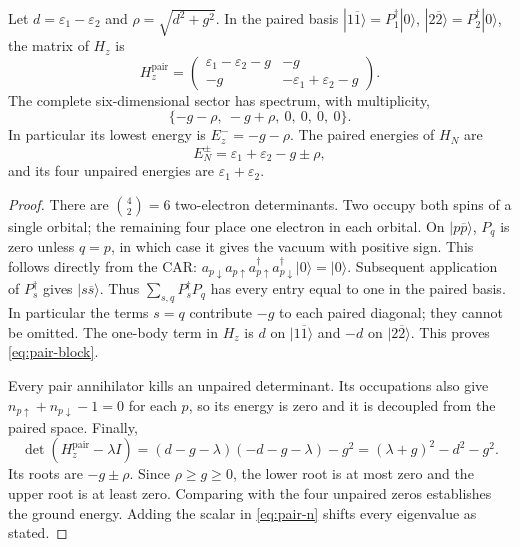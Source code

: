 \begin{proposition}
\label{prop:pairing}
Let $d=\varepsilon_1-\varepsilon_2$ and
$\rho=\sqrt{d^2+g^2}$. In the paired basis
$|1\overline1\rangle=P_1^\dagger|0\rangle$,
$|2\overline2\rangle=P_2^\dagger|0\rangle$, the matrix of $H_z$ is
\begin{equation}
 H_z^{\mathrm{pair}}=
 \begin{pmatrix}
 \varepsilon_1-\varepsilon_2-g&-g\\
 -g&-\varepsilon_1+\varepsilon_2-g
 \end{pmatrix}.
 \label{eq:pair-block}
\end{equation}
The complete six-dimensional sector has spectrum, with multiplicity,
\begin{equation}
 \{-g-\rho,\ -g+\rho,\ 0,\ 0,\ 0,\ 0\}.
 \label{eq:pair-spectrum}
\end{equation}
In particular its lowest energy is $E_z^-=-g-\rho$.
The paired energies of $H_N$ are
\begin{equation}
 E_N^\pm=\varepsilon_1+\varepsilon_2-g\pm\rho,
 \label{eq:number-roots}
\end{equation}
and its four unpaired energies are $\varepsilon_1+\varepsilon_2$.
\end{proposition}
\begin{proof}
There are $\binom42=6$ two-electron determinants. Two occupy both spins
of a single orbital; the remaining four place one electron in each orbital.
On $|p\overline p\rangle$, $P_q$ is zero unless $q=p$, in which case
it gives the vacuum with positive sign. This follows directly from the CAR:
$a_{p\downarrow}a_{p\uparrow}a_{p\uparrow}^\dagger
 a_{p\downarrow}^\dagger|0\rangle=|0\rangle$.
Subsequent application of $P_s^\dagger$ gives
$|s\overline s\rangle$. Thus $\sum_{s,q}P_s^\dagger P_q$ has every
entry equal to one in the paired basis. In particular the terms $s=q$
contribute $-g$ to each paired diagonal; they cannot be omitted.
The one-body term in $H_z$ is $d$ on $|1\overline1\rangle$ and
$-d$ on $|2\overline2\rangle$. This proves \eqref{eq:pair-block}.

Every pair annihilator kills an unpaired determinant. Its occupations also
give $n_{p\uparrow}+n_{p\downarrow}-1=0$ for each $p$, so its energy
is zero and it is decoupled from the paired space. Finally,
\[
 \det(H_z^{\mathrm{pair}}-\lambda I)
 =(d-g-\lambda)(-d-g-\lambda)-g^2
 =(\lambda+g)^2-d^2-g^2.
\]
Its roots are $-g\pm\rho$. Since $\rho\ge g\ge0$, the lower root
is at most zero and the upper root is at least zero. Comparing with the four
unpaired zeros establishes the ground energy. Adding the scalar in
\eqref{eq:pair-n} shifts every eigenvalue as stated.
\end{proof}

